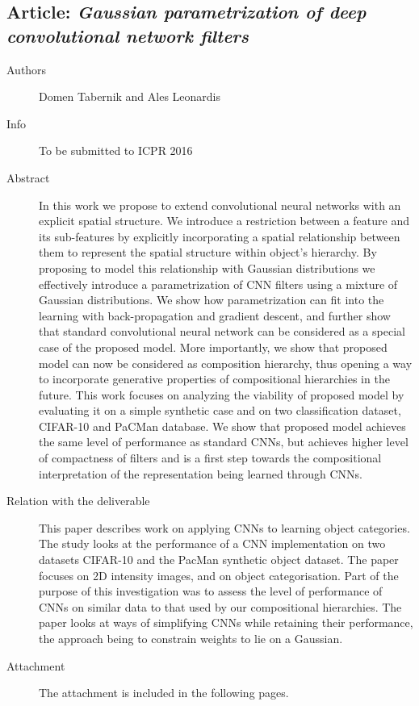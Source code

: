 \documentclass[a4paper,11pt,pdf]{../templates/pacmanreport}
\begin{document}
\subsection{Article: \em Gaussian parametrization of deep convolutional network filters}
\begin{description}
    \item[Authors] Domen Tabernik and Ales Leonardis
    \item[Info] To be submitted to ICPR 2016%
    \item[Abstract] In this work we propose to extend convolutional neural networks with an explicit spatial structure. We introduce
a restriction between a feature and its sub-features by explicitly incorporating a spatial relationship between them to represent
the spatial structure within object’s hierarchy. By proposing to model this relationship with Gaussian distributions we effectively
introduce a parametrization of CNN filters using a mixture of Gaussian distributions. We show how parametrization can fit
into the learning with back-propagation and gradient descent, and further show that standard convolutional neural network
can be considered as a special case of the proposed model. More importantly, we show that proposed model can now be
considered as composition hierarchy, thus opening a way to incorporate generative properties of compositional hierarchies
in the future. This work focuses on analyzing the viability of proposed model by evaluating it on a simple synthetic case and on
two classification dataset, CIFAR-10 and PaCMan database. We show that proposed model achieves the same level of performance
as standard CNNs, but achieves higher level of compactness of filters and is a first step towards the compositional interpretation
of the representation being learned through CNNs.
    \item [Relation with the deliverable] This paper describes work on applying CNNs to learning object categories. The study looks at the performance of a CNN implementation on two datasets CIFAR-10 and the PacMan synthetic object dataset. The paper focuses on 2D intensity images, and on object categorisation. Part of the purpose of this investigation was to assess the level of performance of CNNs on similar data to that used by our compositional hierarchies. The paper looks at ways of simplifying CNNs while retaining their performance, the approach being to constrain weights to lie on a Gaussian. 
    \item[Attachment] The attachment is included in the following pages. %
\end{description}

\newpage
\end{document}
